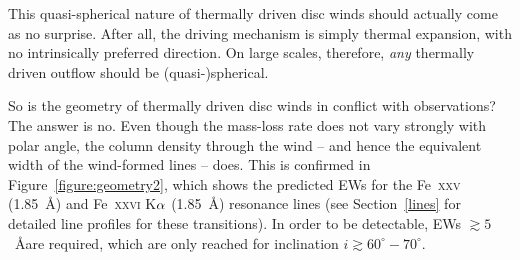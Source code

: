 \documentclass[a4paper,fleqn,usenatbib]{mnras}
\begin{document}
This quasi-spherical nature of thermally driven disc winds should
actually come as no surprise. After all, the driving mechanism is
simply thermal expansion, with no intrinsically preferred
direction. On large scales, therefore, {\em any} thermally driven
outflow should be (quasi-)spherical.

So is the geometry of thermally driven disc winds in conflict with
observations? The answer is no. Even though the mass-loss rate
does not vary strongly with polar angle, the column density
through the wind -- and hence the equivalent width of the
wind-formed lines -- does. This is confirmed in
Figure~\ref{figure:geometry2}, which shows the predicted EWs for the
Fe~\textsc{xxv} (1.85~{\AA}) and Fe~\textsc{xxvi} K$\rm{\alpha}$
(1.85~{\AA}) resonance lines (see Section~\ref{lines} for detailed
line profiles for these transitions). In order to be detectable, EWs
$\gtrsim 5$~\AA are required, which are only reached for inclination
$i \gtrsim 60^\circ - 70^\circ$. 
\end{document}
